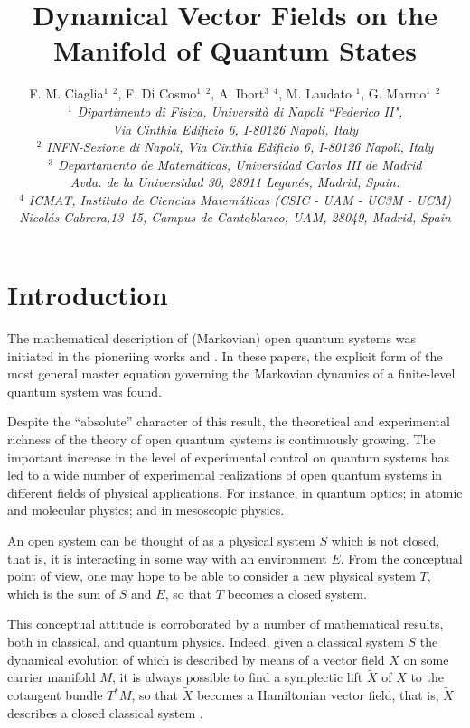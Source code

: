 \documentclass[11pt]{article}
\title{Dynamical Vector Fields on the Manifold of Quantum States}
\author{F. M. Ciaglia$^{1}$ $^{2}$, F. Di Cosmo$^{1}$ $^{2}$, A. Ibort$^{3}$ $^{4}$, M. Laudato $^{1}$, G. Marmo$^{1}$ $^{2}$\\
\textit{$^{1}$ Dipartimento di Fisica, Universit\`a di Napoli ``Federico II",}\\
\textit{Via Cinthia Edificio 6, I-80126 Napoli, Italy}\\
\textit{$^{2}$ INFN-Sezione di Napoli, Via Cinthia Edificio 6, I-80126 Napoli, Italy}\\
\textit{$^{3}$ Departamento de Matem\'{a}ticas, Universidad Carlos III de Madrid}\\
\textit{Avda. de la Universidad 30, 28911 Legan\'{e}s, Madrid, Spain.}\\
\textit{$^{4}$ ICMAT, Instituto de Ciencias Matem\'{a}ticas (CSIC - UAM - UC3M - UCM)} \\  
\textit{Nicol\'{a}s Cabrera,13–15, Campus de Cantoblanco, UAM, 28049, Madrid, Spain}}
\date{}
\newcommand{\vsp}{\vspace{0.4cm}}
\begin{document}
\maketitle




\section{Introduction}






The mathematical description of (Markovian) open quantum systems was initiated in the pioneriing works \cite{gorini_kossakowski_sudarshan-completely_positive_dynamical_semigroups_of_N-level_systems} and \cite{lindblad-on_the_generators_of_quantum_dynamical_semigroups}.
In these papers, the explicit form of the most general master equation governing the Markovian dynamics of a finite-level quantum system was found.

Despite the ``absolute'' character of this result, the theoretical and experimental richness of the theory of open quantum systems is continuously growing.
The important increase in the level of experimental control on quantum systems has led to a wide number of experimental realizations of open quantum systems in different fields of physical applications.
For instance, in quantum optics; in atomic and molecular physics; and in mesoscopic physics.

\vsp

An open system can be thought of as a physical system $\mathit{S}$ which is not closed, that is, it is interacting in some way with an environment $\mathit{E}$.
From the conceptual point of view, one may hope to be able to consider a new physical system $\mathit{T}$, which is the sum of $\mathit{S}$ and $\mathit{E}$, so that $\mathit{T}$ becomes a closed system.

This conceptual attitude is corroborated by a number of mathematical results, both in classical, and quantum physics.
Indeed, given a classical system $\mathit{S}$ the dynamical evolution of which is described by means of a vector field $X$ on some carrier manifold $M$, it is always possible to find a symplectic lift $\tilde{X}$ of $X$ to the cotangent bundle $T^{*}M$, so that $\tilde{X}$ becomes a Hamiltonian vector field, that is, $\tilde{X}$ describes a closed classical system \cite{arnold-mathematical_methods_of_classical_mechanics,abraham_marsden-foundations_of_mechanics}.
\end{document}

